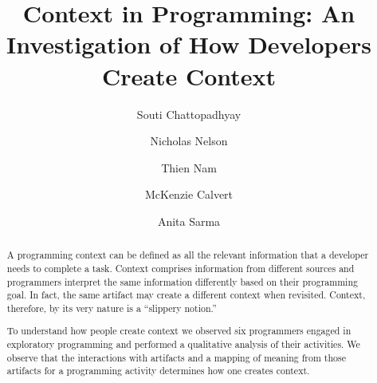 \documentclass[sigconf]{acmart}
\begin{document}
\title{Context in Programming: An Investigation of How Developers Create Context}

\author{Souti Chattopadhyay}

\author{Nicholas Nelson}

\author{Thien Nam}

\author{McKenzie Calvert}

\author{Anita Sarma}

\renewcommand{\shortauthors}{S. Chattopadhyay et al.}


\begin{abstract}
A programming context can be defined as all the relevant information that a developer needs to complete a task. Context comprises information from different sources and programmers interpret the same information differently based on their programming goal. In fact, the same artifact may create a different context when revisited. Context, therefore, by its very nature is a ``slippery notion.''

To understand how people create context we observed six programmers engaged in exploratory programming and performed a qualitative analysis of their activities. We observe that the interactions with artifacts and a mapping of meaning from those artifacts for a programming activity determines how one creates context.
\end{abstract}

%
%
\end{document}
